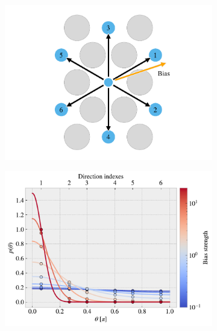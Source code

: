 \begin{figure}[!htb]
  \centering
  \begin{subfigure}[t]{0.48\textwidth}
      \centering
      \includegraphics[width=\textwidth]{figures/system/bias_prob_a.pdf}
      \caption{}
      \label{fig:bias_prob_a}
    \end{subfigure}
    \hfill
    \begin{subfigure}[t]{0.48\textwidth}
      \centering
      \includegraphics[width=\textwidth]{figures/system/bias_prob_b.pdf}
      \caption{}
      \label{fig:bias_prob_b}
  \end{subfigure}
  \hfill

\end{figure}
